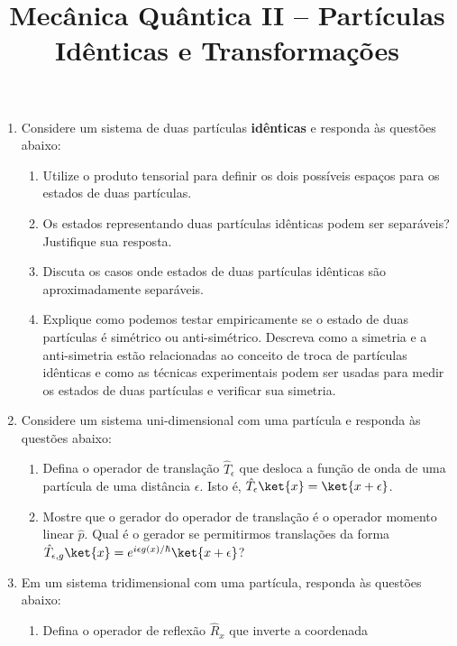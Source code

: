 \newif\ifuseseminar
\useseminartrue


\title{Mecânica Quântica II -- Partículas Idênticas e Transformações}


\begin{enumerate}
	\item Considere um sistema de duas partículas {\bf idênticas} e responda às questões
	      abaixo:
	      \begin{enumerate}
		      \item Utilize o produto tensorial para definir os dois possíveis espaços
		            para os estados de duas partículas.
		      \item Os estados representando duas partículas idênticas podem ser
		            separáveis? Justifique sua resposta.
		      \item Discuta os casos onde estados de duas partículas idênticas são
		            aproximadamente separáveis.
		      \item Explique como podemos testar empiricamente se o estado de duas
		            partículas é simétrico ou anti-simétrico. Descreva como a simetria e a
		            anti-simetria estão relacionadas ao conceito de troca de partículas
		            idênticas e como as técnicas experimentais podem ser usadas para medir os
		            estados de duas partículas e verificar sua simetria.
	      \end{enumerate}
	\item Considere um sistema uni-dimensional com uma partícula e responda às questões
	      abaixo:
	      \begin{enumerate}
		      \item Defina o operador de translação $\hat{T}_\epsilon$ que desloca a
		            função de onda de uma partícula de uma distância $\epsilon$.
		            Isto é, $\hat{T}_\epsilon\ket{x} = \ket{x+\epsilon}$.
		      \item Mostre que o gerador do operador de translação é o operador momento
		            linear $\hat{p}$. Qual é o gerador se permitirmos translações da
		            forma $\hat{T}_{\epsilon,g}\ket{x} = e^{i\epsilon
					            g(x)/\hbar}\ket{x+\epsilon}$?
	      \end{enumerate}
	\item Em um sistema tridimensional com uma partícula, responda às questões abaixo:
	      \begin{enumerate}
		      \item Defina o operador de reflexão $\hat{R}_x$ que inverte a coordenada

\end{enumerate}
\end{enumerate}
